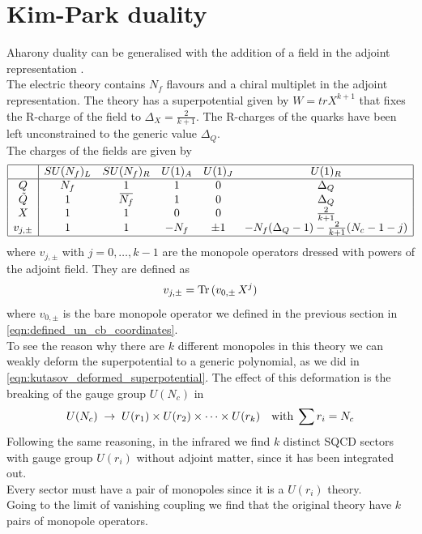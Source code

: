 \section{Kim-Park duality}
Aharony duality can be generalised with the addition of a field in the adjoint representation \cite{Kim:2013cma}.\\
The electric theory contains $N_f$ flavours and a chiral multiplet in the adjoint representation. 
The theory has a superpotential given by $W = tr X^{k+1}$ that fixes the R-charge of the field to $\Delta_X = \frac{2}{k+1}$.
The R-charges of the quarks have been left unconstrained to the generic value $\Delta_Q$.\\
The charges of the fields are given by
\begin{equation}
\begin{array}{ | c | c c c c c |}
\hline
  & SU(N_f)_L & SU(N_f)_R & U(1)_A & U(1)_J  & U(1)_R   \\
 \hline
 Q & N_f & 1& 1 & 0   & \Delta_Q  \\  
 \tilde{Q} & 1 & \overbar{N_f} & 1 & 0 & \Delta_Q      \\  
  X & 1 & 1  & 0 & 0 & \frac{2}{k+1}  \\ 
 v_{j,\pm} & 1  &1   & - N_f & \pm 1 & -N_f (\Delta_Q-1 ) - \frac{2}{k+1} (N_c-1 - j) \\
 \hline
\end{array}
\end{equation}
where $v_{j,\pm}$ with $j=0,\dotsc,k-1$ are the monopole operators dressed with powers of the adjoint field. 
They are defined as \cite{Kim:2013cma}
\begin{equation}
v_{j,\pm} = \mathrm{Tr } \,{( v_{0,\pm} \, X^{j})}
\label{eqn:3d_mag_monopoles_def}
\end{equation}
where $v_{0,\pm}$ is the bare monopole operator we defined in the previous section in \eqref{eqn:defined_un_cb_coordinates}.\\
To see the reason why there are $k$ different monopoles in this theory we can weakly deform the superpotential to a generic polynomial, as we did in \eqref{eqn:kutasov_deformed_superpotential}.
The effect of this deformation is the breaking of the gauge group $U(N_c)$ in 
\begin{equation}
U(N_c) \; \rightarrow \; U(r_1) \times U(r_2) \times \dots \times U(r_k) \quad \hbox{with} \; \sum r_i = N_c
\end{equation}
Following the same reasoning, in the infrared we find $k$ distinct SQCD sectors with gauge group $U(r_i)$ without adjoint matter, since it has been integrated out.\\
Every sector must have a pair of monopoles since it is a $U(r_i)$ theory.\\
Going to the limit of vanishing coupling we find that the original theory have $k$ pairs of monopole operators.\\


